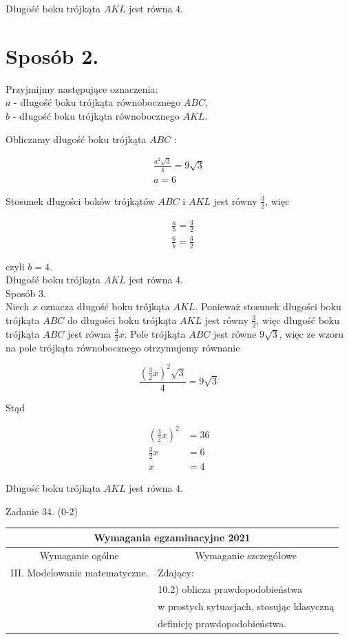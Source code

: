 \documentclass[10pt]{article}
\begin{document}
Długość boku trójkąta $A K L$ jest równa 4.

\section*{Sposób 2.}
Przyjmijmy następujące oznaczenia:\\
$a$ - długość boku trójkąta równobocznego $A B C$,\\
$b$ - długość boku trójkąta równobocznego $A K L$.

Obliczamy długość boku trójkąta $A B C$ :

$$
\begin{gathered}
\frac{a^{2} \sqrt{3}}{4}=9 \sqrt{3} \\
a=6
\end{gathered}
$$

Stosunek długości boków trójkątów $A B C$ i $A K L$ jest równy $\frac{3}{2}$, więc

$$
\begin{aligned}
& \frac{a}{b}=\frac{3}{2} \\
& \frac{6}{b}=\frac{3}{2}
\end{aligned}
$$

czyli $b=4$.\\
Długość boku trójkąta $A K L$ jest równa 4.\\
Sposób 3.\\
Niech $x$ oznacza długość boku trójkąta $A K L$. Ponieważ stosunek długości boku trójkąta $A B C$ do długości boku trójkąta $A K L$ jest równy $\frac{3}{2}$, więc długość boku trójkąta $A B C$ jest równa $\frac{3}{2} x$. Pole trójkąta $A B C$ jest równe $9 \sqrt{3}$, więc ze wzoru na pole trójkąta równobocznego otrzymujemy równanie

$$
\frac{\left(\frac{3}{2} x\right)^{2} \sqrt{3}}{4}=9 \sqrt{3}
$$

Stąd

$$
\begin{aligned}
\left(\frac{3}{2} x\right)^{2} & =36 \\
\frac{3}{2} x & =6 \\
x & =4
\end{aligned}
$$

Długość boku trójkąta $A K L$ jest równa 4.

Zadanie 34. (0-2)

\begin{center}
\begin{tabular}{|l|l|}
\hline
\multicolumn{2}{|c|}{Wymagania egzaminacyjne 2021} \\
\hline
\multicolumn{1}{|c|}{Wymaganie ogólne} & \multicolumn{1}{c|}{Wymaganie szczegółowe} \\
\hline
III. Modelowanie matematyczne. & Zdający: \\
 & 10.2) oblicza prawdopodobieństwa \\
 & w prostych sytuacjach, stosując klasyczną \\
 & definicję prawdopodobieństwa. \\
\hline
\end{tabular}
\end{center}
\end{document}
